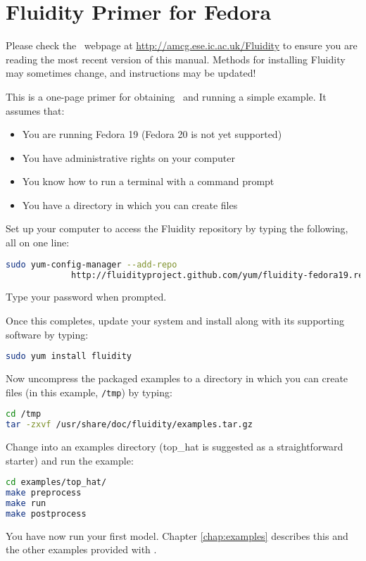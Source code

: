 \chapter*{Fluidity Primer for Fedora}

Please check the \fluidity\ webpage at
\href{http://amcg.ese.ic.ac.uk/Fluidity}{http://amcg.ese.ic.ac.uk/Fluidity}
to ensure you are reading the most recent version of this manual. Methods for
installing Fluidity may sometimes change, and instructions may be updated!

This is a one-page primer for obtaining \fluidity\ and running a simple example. It assumes that:

\begin{itemize}
 \item You are running Fedora 19 (Fedora 20 is not yet supported)
 \item You have administrative rights on your computer
 \item You know how to run a terminal with a command prompt
 \item You have a directory in which you can create files
\end{itemize}

Set up your computer to access the Fluidity repository by typing the following,
all on one line:

\begin{lstlisting}[language=Bash]
sudo yum-config-manager --add-repo
             http://fluidityproject.github.com/yum/fluidity-fedora19.repo
\end{lstlisting}

Type your password when prompted.

Once this completes, update your system and install \fluidity along with its
supporting software by typing:

\begin{lstlisting}[language=Bash]
sudo yum install fluidity
\end{lstlisting}

Now uncompress the packaged examples to a directory in which you can create
files (in this example, \lstinline[language=Bash]+/tmp+) by typing:

\begin{lstlisting}[language=Bash]
cd /tmp
tar -zxvf /usr/share/doc/fluidity/examples.tar.gz
\end{lstlisting}

Change into an examples directory (top\_hat is suggested as a straightforward
starter) and run the example:

\begin{lstlisting}[language=Bash]
cd examples/top_hat/
make preprocess
make run
make postprocess
\end{lstlisting}

You have now run your first \fluidity model. Chapter \ref{chap:examples}
describes this and the other examples provided with \fluidity.
